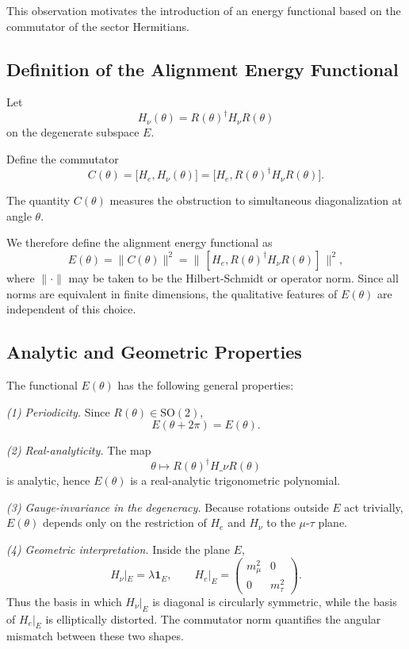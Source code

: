 This observation motivates the introduction of an energy functional based on the commutator of the sector Hermitians.

\subsection{Definition of the Alignment Energy Functional}

Let
\[
H_\nu(\theta)=R(\theta)^\dagger H_\nu R(\theta)
\]
on the degenerate subspace $E$.

Define the commutator
\[
C(\theta)=\big[H_e, H_\nu(\theta)\big]
= \big[H_e, R(\theta)^\dagger H_\nu R(\theta)\big].
\]

The quantity $C(\theta)$ measures the obstruction to simultaneous diagonalization at angle $\theta$.

We therefore define the alignment energy functional as
\begin{equation}
\boxed{
E(\theta) = \lVert C(\theta) \rVert^2
= \big\lVert\, [H_e, R(\theta)^\dagger H_\nu R(\theta)] \,\big\rVert^2,
}
\end{equation}
where $\lVert\cdot\rVert$ may be taken to be the Hilbert-Schmidt or operator norm. Since all norms are equivalent in finite dimensions, the qualitative features of $E(\theta)$ are independent of this choice.

\subsection{Analytic and Geometric Properties}

The functional $E(\theta)$ has the following general properties:

\emph{(1) Periodicity.}
Since $R(\theta)\in\mathrm{SO}(2)$,
\[
E(\theta+2\pi)=E(\theta).
\]

\emph{(2) Real-analyticity.}
The map
\[
\theta \longmapsto R(\theta)^\dagger H\_\nu R(\theta)
\]
is analytic, hence $E(\theta)$ is a real-analytic trigonometric polynomial.

\emph{(3) Gauge-invariance in the degeneracy.}
Because rotations outside $E$ act trivially, $E(\theta)$ depends only on the restriction of $H_e$ and $H_\nu$ to the $\mu$-$\tau$ plane.

\emph{(4) Geometric interpretation.}
Inside the plane $E$,
\[
H_\nu|_E = \lambda \mathbf 1_E,
\qquad
H_e|_E =
\begin{pmatrix}
m_\mu^2 & 0 \\[0.3em]
0 & m_\tau^2
\end{pmatrix}.
\]
Thus the basis in which $H_\nu|_E$ is diagonal is circularly symmetric, while the basis of $H_e|_E$ is elliptically distorted. The commutator norm quantifies the angular mismatch between these two shapes.

